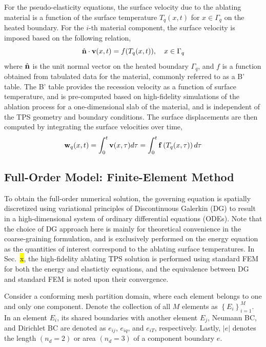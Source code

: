 For the pseudo-elasticity equations, the surface velocity due to the ablating material is a function of the surface temperature $T_q(x,t)$ for $x\in\Gamma_q$ on the heated boundary. For the $i$-th material component, the surface velocity is imposed based on the following relation,
\begin{equation}
    \hat{{\mathbf{n}}}\cdot\mathbf{v}(x,t) = f(T_q(x,t)),\quad x\in\Gamma_q\label{eqn_boundary_velocity}
\end{equation}
where $\hat{{\mathbf{n}}}$ is the unit normal vector on the heated boundary $\Gamma_q$, and $f$ is a function obtained from tabulated data for the material, commonly referred to as a B' table. The B' table provides the recession velocity as a function of surface temperature, and is pre-computed based on high-fidelity simulations of the ablation process for a one-dimensional slab of the material, and is independent of the TPS geometry and boundary conditions. The surface displacements are then computed by integrating the surface velocities over time,
\begin{equation}
    \mathbf{w}_q(x,t) = \int_{0}^{t} \mathbf{v}(x,\tau)d\tau = \int_{0}^{t}\mathbf{f}\left(T_q(x,\tau)\right)d\tau\label{eqn_boundary_displacement}
\end{equation}

\subsection{Full-Order Model: Finite-Element Method}\label{sec_fom}

To obtain the full-order numerical solution, the governing equation is spatially discretized using variational principles of Discontinuous Galerkin (DG) to result in a high-dimensional system of ordinary differential equations (ODEs). Note that the choice of DG approach here is mainly for theoretical convenience in the coarse-graining formulation, and is exclusively performed on the energy equation as the quantities of interest correspond to the ablating surface temperatures. In Sec.~\hl{x}, the high-fidelity ablating TPS solution is performed using standard FEM for both the energy and elastictiy equations, and the equivalence between DG and standard FEM is noted upon their convergence.

Consider a conforming mesh partition domain, where each element belongs to one and only one component. Denote the collection of all $M$ elements as $\left\{E_i\right\}_{i=1}^{M}$. In an element $E_i$, its shared boundaries with another element $E_j$, Neumann BC, and Dirichlet BC are denoted as $e_{ij}$, $e_{iq}$, and $e_{iT}$, respectively. Lastly, $\left|e\right|$ denotes the length $(n_d=2)$ or area $(n_d=3)$ of a component boundary $e$.

